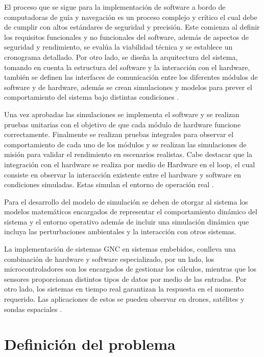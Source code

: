\documentclass[12pt]{article}
\begin{document}
El proceso que se sigue para la implementación de software a bordo de computadoras de guía y navegación es un proceso complejo y crítico el cual debe de cumplir con altos estándares de seguridad y precisión. Este comienza al definir los requisitos funcionales y no funcionales del software, además de aspectos de seguridad y rendimiento, se evalúa la viabilidad técnica y se establece un cronograma detallado. Por otro lado, se diseña la arquitectura del sistema, tomando en cuenta la estructura del software y la interacción con el hardware, también se definen las interfaces de comunicación entre los diferentes módulos de software y de hardware, además se crean simulaciones y modelos para prever el comportamiento del sistema bajo distintas condiciones \cite{Furfaro1997}. 

Una vez aprobadas las simulaciones se implementa el software y se realizan pruebas unitarias con el objetivo de que cada módulo de hardware funcione correctamente. Finalmente se realizan pruebas integrales para observar el comportamiento de cada uno de los módulos y se realizan las simulaciones de misión para validar el rendimiento en escenarios realistas. Cabe destacar que la integración con el hardware se realiza por medio de Hardware en el loop, el cual consiste en observar la interacción existente entre el hardware y software en condiciones simuladas. Estas simulan el entorno de operación real \cite{chai2021review}. 

Para el desarrollo del modelo de simulación se deben de otorgar al sistema los modelos matemáticos encargados de representar el comportamiento dinámico del sistema y el entorno operativo además de incluir una simulación dinámica que incluya las perturbaciones ambientales y la interacción con otros sistemas.

La implementación de sistemas GNC en sistemas embebidos, conlleva una combinación de hardware y software especializado, por un lado, los microcontroladores son los encargados de gestionar los cálculos, mientras que los sensores proporcionan distintos tipos de datos por medio de las entradas. Por otro lado, los sistemas en tiempo real garantizan la respuesta en el momento requerido. Las aplicaciones de estos se pueden observar en drones, satélites y sondas espaciales \cite{MathWorks2024_ss}.


\section{Definición del problema}
\end{document}
